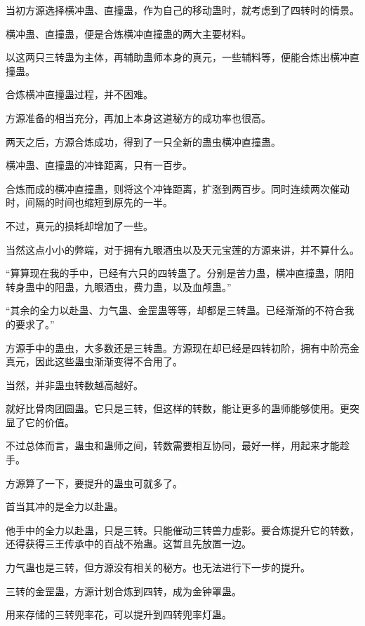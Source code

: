 
\begin{this_body}

当初方源选择横冲蛊、直撞蛊，作为自己的移动蛊时，就考虑到了四转时的情景。

横冲蛊、直撞蛊，便是合炼横冲直撞蛊的两大主要材料。

以这两只三转蛊为主体，再辅助蛊师本身的真元，一些辅料等，便能合炼出横冲直撞蛊。

合炼横冲直撞蛊过程，并不困难。

方源准备的相当充分，再加上本身这道秘方的成功率也很高。

两天之后，方源合炼成功，得到了一只全新的蛊虫横冲直撞蛊。

横冲蛊、直撞蛊的冲锋距离，只有一百步。

合炼而成的横冲直撞蛊，则将这个冲锋距离，扩涨到两百步。同时连续两次催动时，间隔的时间也缩短到原先的一半。

不过，真元的损耗却增加了一些。

当然这点小小的弊端，对于拥有九眼酒虫以及天元宝莲的方源来讲，并不算什么。

“算算现在我的手中，已经有六只的四转蛊了。分别是苦力蛊，横冲直撞蛊，阴阳转身蛊中的阳蛊，九眼酒虫，费力蛊，以及血颅蛊。”

“其余的全力以赴蛊、力气蛊、金罡蛊等等，却都是三转蛊。已经渐渐的不符合我的要求了。”

方源手中的蛊虫，大多数还是三转蛊。方源现在却已经是四转初阶，拥有中阶亮金真元，因此这些蛊虫渐渐变得不合用了。

当然，并非蛊虫转数越高越好。

就好比骨肉团圆蛊。它只是三转，但这样的转数，能让更多的蛊师能够使用。更突显了它的价值。

不过总体而言，蛊虫和蛊师之间，转数需要相互协同，最好一样，用起来才能趁手。

方源算了一下，要提升的蛊虫可就多了。

首当其冲的是全力以赴蛊。

他手中的全力以赴蛊，只是三转。只能催动三转兽力虚影。要合炼提升它的转数，还得获得三王传承中的百战不殆蛊。这暂且先放置一边。

力气蛊也是三转，但方源没有相关的秘方。也无法进行下一步的提升。

三转的金罡蛊，方源计划合炼到四转，成为金钟罩蛊。

用来存储的三转兜率花，可以提升到四转兜率灯蛊。


\end{this_body}
